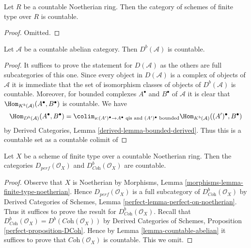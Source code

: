 \begin{lemma}
\label{lemma-countable-finite-type}
Let $R$ be a countable Noetherian ring. Then the category of schemes of finite
type over $R$ is countable.
\end{lemma}

\begin{proof}
Omitted.
\end{proof}

\begin{lemma}
\label{lemma-countable-abelian}
Let $\mathcal{A}$ be a countable abelian category.
Then $D^b(\mathcal{A})$ is countable.
\end{lemma}

\begin{proof}
It suffices to prove the statement for $D(\mathcal{A})$ as the others
are full subcategories of this one. Since every object in $D(\mathcal{A})$
is a complex of objects of $\mathcal{A}$ it is immediate that the set of
isomorphism classes of objects of $D^b(\mathcal{A})$ is countable.
Moreover, for bounded complexes $A^\bullet$ and $B^\bullet$ of $\mathcal{A}$
it is clear that $\Hom_{K^b(\mathcal{A})}(A^\bullet, B^\bullet)$ is countable.
We have
$$
\Hom_{D^b(\mathcal{A})}(A^\bullet, B^\bullet) =
\colim_{s : (A')^\bullet \to A^\bullet
\text{ qis and }(A')^\bullet\text{ bounded}}
\Hom_{K^b(\mathcal{A})}((A')^\bullet, B^\bullet)
$$
by Derived Categories, Lemma \ref{derived-lemma-bounded-derived}.
Thus this is a countable set as a countable colimit of
\end{proof}

\begin{lemma}
\label{lemma-countable-perfect}
Let $X$ be a scheme of finite type over a countable Noetherian ring.
Then the categories $D_{perf}(\mathcal{O}_X)$ and
$D^b_{\textit{Coh}}(\mathcal{O}_X)$ are countable.
\end{lemma}

\begin{proof}
Observe that $X$ is Noetherian by
Morphisms, Lemma \ref{morphisms-lemma-finite-type-noetherian}.
Hence $D_{perf}(\mathcal{O}_X)$ is a full subcategory of
$D^b_{\textit{Coh}}(\mathcal{O}_X)$ by
Derived Categories of Schemes, Lemma \ref{perfect-lemma-perfect-on-noetherian}.
Thus it suffices to prove
the result for $D^b_{\textit{Coh}}(\mathcal{O}_X)$.
Recall that
$D^b_{\textit{Coh}}(\mathcal{O}_X) = D^b(\textit{Coh}(\mathcal{O}_X))$
by
Derived Categories of Schemes, Proposition \ref{perfect-proposition-DCoh}.
Hence by Lemma \ref{lemma-countable-abelian}
it suffices to prove that $\textit{Coh}(\mathcal{O}_X)$ is
countable. This we omit.
\end{proof}

